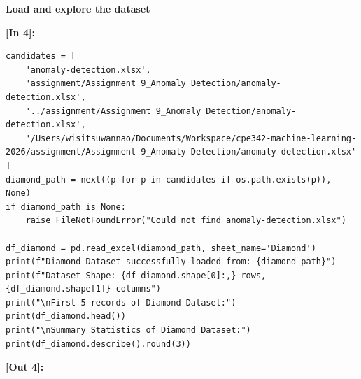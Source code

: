 \vspace{0.3em}
\begin{tcolorbox}[colback=gray!5!white,colframe=gray!50!black,boxrule=0.5pt,arc=2pt,left=5pt,right=5pt,top=2pt,bottom=2pt,unbreakable,before upper={\sloppy\raggedright}]
{\small\bfseries Load and explore the dataset\par}
\end{tcolorbox}
\vspace{0.2em}
\vspace{0.4em}
\noindent\textbf{\small [In 4]:}
\begin{lstlisting}[style=pycode]
candidates = [
    'anomaly-detection.xlsx',
    'assignment/Assignment 9_Anomaly Detection/anomaly-detection.xlsx',
    '../assignment/Assignment 9_Anomaly Detection/anomaly-detection.xlsx',
    '/Users/wisitsuwannao/Documents/Workspace/cpe342-machine-learning-2026/assignment/Assignment 9_Anomaly Detection/anomaly-detection.xlsx'
]
diamond_path = next((p for p in candidates if os.path.exists(p)), None)
if diamond_path is None:
    raise FileNotFoundError("Could not find anomaly-detection.xlsx")

df_diamond = pd.read_excel(diamond_path, sheet_name='Diamond')
print(f"Diamond Dataset successfully loaded from: {diamond_path}")
print(f"Dataset Shape: {df_diamond.shape[0]:,} rows, {df_diamond.shape[1]} columns")
print("\nFirst 5 records of Diamond Dataset:")
print(df_diamond.head())
print("\nSummary Statistics of Diamond Dataset:")
print(df_diamond.describe().round(3))
\end{lstlisting}
\vspace{0.2em}
\noindent\textbf{\small [Out 4]:}
